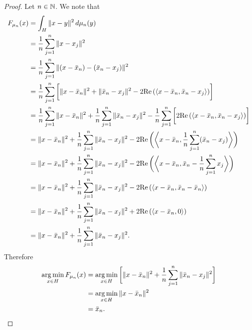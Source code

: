 \documentclass{book}
\begin{document}
	\begin{proof}
		Let $n \in \mathbb{N}$. We note that
		\begin{align*}
			F_{\mu_n}(x)
			& = \int_H \|x - y\|^2 \, d \mu_n(y) \\
			& = \frac{1}{n} \sum\limits_{j=1}^n \|x - x_j\|^2 \\
			& = \frac{1}{n} \sum\limits_{j=1}^n \|(x - \bar{x}_n) - (\bar{x}_n- x_j)\|^2 \\
			& = \frac{1}{n} \sum\limits_{j=1}^n \bigg[ \|x - \bar{x}_n\|^2 + \|\bar{x}_n- x_j\|^2 - 2 \text{Re} \,(\langle x - \bar{x}_n, \bar{x}_n - x_j \rangle) \bigg] \\
			& = \frac{1}{n} \sum\limits_{j=1}^n  \|x - \bar{x}_n\|^2 +  \frac{1}{n} \sum\limits_{j=1}^n \|\bar{x}_n- x_j\|^2   - \frac{1}{n} \sum\limits_{j=1}^n \bigg[ 2 \text{Re} \,(\langle x - \bar{x}_n, \bar{x}_n - x_j \rangle) \bigg] \\
			& = \|x - \bar{x}_n\|^2 +  \frac{1}{n} \sum\limits_{j=1}^n \|\bar{x}_n- x_j\|^2  -  2 \text{Re} \,\bigg( \bigg \langle x - \bar{x}_n, \frac{1}{n} \sum\limits_{j=1}^n (\bar{x}_n- x_j) \bigg \rangle \bigg)  \\
			& = \|x - \bar{x}_n\|^2 +  \frac{1}{n} \sum\limits_{j=1}^n \|\bar{x}_n- x_j\|^2  -  2 \text{Re} \,\bigg( \bigg\langle x - \bar{x}_n, \bar{x}_n - \frac{1}{n} \sum\limits_{j=1}^n x_j \bigg \rangle \bigg) \\
			& = \|x - \bar{x}_n\|^2 +  \frac{1}{n} \sum\limits_{j=1}^n \|\bar{x}_n- x_j\|^2  -  2 \text{Re} \,( \langle x - \bar{x}_n, \bar{x}_n - \bar{x}_n  \rangle ) \\
			& = \|x - \bar{x}_n\|^2 +  \frac{1}{n} \sum\limits_{j=1}^n \|\bar{x}_n- x_j\|^2  +  2 \text{Re} \,( \langle x - \bar{x}_n, 0 \rangle ) \\
			& = \|x - \bar{x}_n\|^2 +  \frac{1}{n} \sum\limits_{j=1}^n \|\bar{x}_n- x_j\|^2. \\
		\end{align*}
		Therefore
		\begin{align*}
			\operatorname*{arg\,min}_{x \in H} F_{\mu_n}(x)
			& = \operatorname*{arg\,min}\limits_{x \in H}  \bigg[ \|x - \bar{x}_n\|^2 +  \frac{1}{n} \sum\limits_{j=1}^n \|\bar{x}_n- x_j\|^2 \bigg] \\
			& = \operatorname*{arg\,min}\limits_{x \in H} \|x - \bar{x}_n\|^2 \\
			& = \bar{x}_n.
		\end{align*}
	\end{proof} 
	
	
	
	
	
	
	
	
	
	
	
\end{document}
